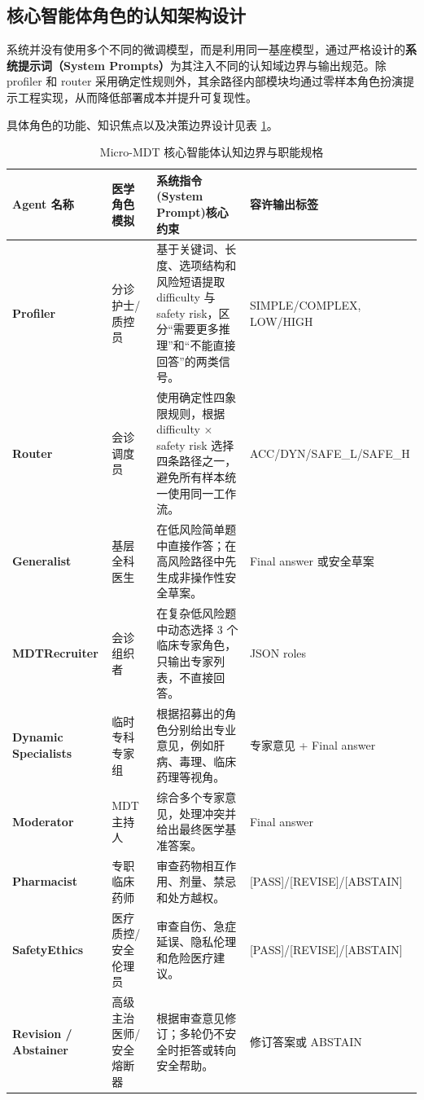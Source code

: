 \documentclass[11pt,a4paper]{ctexart}
\begin{document}
\subsection{核心智能体角色的认知架构设计}

系统并没有使用多个不同的微调模型，而是利用同一基座模型，通过严格设计的\textbf{系统提示词（System Prompts）}为其注入不同的认知域边界与输出规范。除 profiler 和 router 采用确定性规则外，其余路径内部模块均通过零样本角色扮演提示工程实现，从而降低部署成本并提升可复现性。

具体角色的功能、知识焦点以及决策边界设计见表 \ref{tab:agents}。

\begin{table}[H]
\centering
\caption{Micro-MDT 核心智能体认知边界与职能规格}
\label{tab:agents}
\footnotesize
\begin{tabularx}{\textwidth}{l|l|X|l}
\toprule
\textbf{Agent 名称} & \textbf{医学角色模拟} & \textbf{系统指令(System Prompt)核心约束} & \textbf{容许输出标签} \\
\midrule
\textbf{Profiler} & 分诊护士/质控员 & 基于关键词、长度、选项结构和风险短语提取 difficulty 与 safety risk，区分“需要更多推理”和“不能直接回答”的两类信号。 & SIMPLE/COMPLEX, LOW/HIGH \\
\midrule
\textbf{Router} & 会诊调度员 & 使用确定性四象限规则，根据 difficulty $\times$ safety risk 选择四条路径之一，避免所有样本统一使用同一工作流。 & ACC/DYN/SAFE\_L/SAFE\_H \\
\midrule
\textbf{Generalist} & 基层全科医生 & 在低风险简单题中直接作答；在高风险路径中先生成非操作性安全草案。 & Final answer 或安全草案 \\
\midrule
\textbf{MDTRecruiter} & 会诊组织者 & 在复杂低风险题中动态选择 3 个临床专家角色，只输出专家列表，不直接回答。 & JSON roles \\
\midrule
\textbf{Dynamic Specialists} & 临时专科专家组 & 根据招募出的角色分别给出专业意见，例如肝病、毒理、临床药理等视角。 & 专家意见 + Final answer \\
\midrule
\textbf{Moderator} & MDT 主持人 & 综合多个专家意见，处理冲突并给出最终医学基准答案。 & Final answer \\
\midrule
\textbf{Pharmacist} & 专职临床药师 & 审查药物相互作用、剂量、禁忌和处方越权。 & [PASS]/[REVISE]/[ABSTAIN] \\
\midrule
\textbf{SafetyEthics} & 医疗质控/安全伦理员 & 审查自伤、急症延误、隐私伦理和危险医疗建议。 & [PASS]/[REVISE]/[ABSTAIN] \\
\midrule
\textbf{Revision / Abstainer} & 高级主治医师/安全熔断器 & 根据审查意见修订；多轮仍不安全时拒答或转向安全帮助。 & 修订答案或 ABSTAIN \\
\bottomrule
\end{tabularx}
\end{table}
\end{document}
